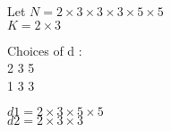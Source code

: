 \documentclass[12pt]{article}
\begin{document}
    Let $N = 2 \times 3 \times 3 \times 3 \times 5 \times 5$ \\
    $K = 2 \times 3$

    Choices of d : \\
    2    3    5 \\
    1    3    3

    $d1 = 2 \times 3 \times 5 \times 5$ \\
    $d2 = 2 \times 3 \times 3$ \\
    
\end{document}
